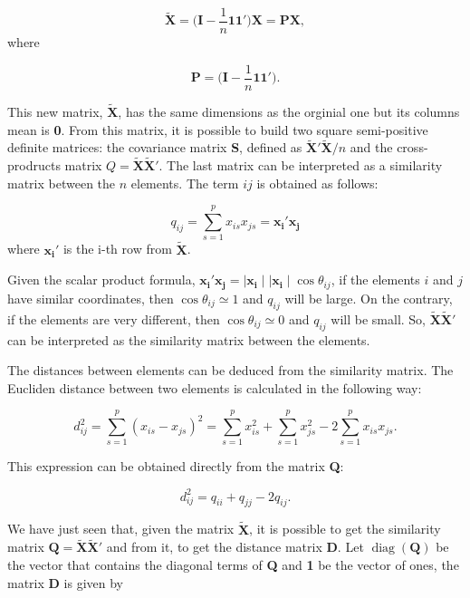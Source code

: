 \documentclass[11pt]{report}
\DeclareMathOperator{\diag}{diag}
\begin{document}
\[
\mathbf{\widetilde{X}} = \Big( \mathbf{I} - \frac{1}{n} \mathbf{1}\mathbf{1'}\Big) \mathbf{X} = \mathbf{P}\mathbf{X},
\]
where 

\[
\mathbf{P} = \Big( \mathbf{I} - \frac{1}{n} \mathbf{1}\mathbf{1'}\Big).
\]

\indent This new matrix, $\mathbf{\widetilde{X}}$, has the same dimensions as 
the orginial one but its columns mean is \textbf{0}. From this matrix, it is 
possible to build two square semi-positive definite matrices: the covariance 
matrix \textbf{S}, defined as $\mathbf{\widetilde{X}'}\mathbf{\widetilde{X}}/n$ 
and the cross-prodructs matrix $Q = \mathbf{\widetilde{X}}\mathbf{\widetilde{X}'}$. 
The last matrix can be interpreted as a similarity matrix between the $n$ elements. 
The term $ij$ is obtained as follows:

\begin{equation} \label{qij}
q_{ij} = \sum_{s=1}^{p} x_{is}x_{js} = \mathbf{x_i'} \mathbf{x_j}
\end{equation}
where $\mathbf{x_i}'$ is the i-th row from $\mathbf{\widetilde{X}}$. 

\indent Given the scalar product formula, 
${\mathbf{x_i'}\mathbf{x_j} =  \mid \mathbf{x_i} \mid \mid \mathbf{x_i} \mid \cos\theta_{ij}}$,
if the elements $i$ and $j$ have similar coordinates, then $\cos\theta_{ij} \simeq 1$
and $q_{ij}$ will be large. On the contrary, if the elements are very different,
then $\cos \theta_{ij} \simeq 0$ and $q_{ij}$ will be small. So, 
$\mathbf{\widetilde{X}}\mathbf{\widetilde{X}'}$ can be interpreted as the similarity
matrix between the elements.

\indent The distances between elements can be deduced from the similarity 
matrix. The Eucliden distance between two elements is calculated in the 
following way:

\begin{equation} \label{dij}
d^2_{ij} =  \sum_{s=1}^{p} (x_{is}- x_{js} )^2  = \sum_{s=1}^{p}x_{is}^2 + \sum_{s=1}^p x_{js}^2 - 2\sum_{s=1}^{p} x_{is}x_{js}.
\end{equation}

\indent This expression can be obtained directly from the matrix \textbf{Q}:

\begin{equation} \label{dfromq}
d^2_{ij} = q_{ii} + q_{jj} - 2q_{ij}.
\end{equation}

\indent We have just seen that, given the matrix $\mathbf{\widetilde{X}}$, 
it is possible to get the similarity matrix 
$\mathbf{Q} = \mathbf{\widetilde{X}}\mathbf{\widetilde{X}'}$ and from it, 
to get the distance matrix \textbf{D}. Let $\diag(\mathbf{Q})$ be the
vector that contains the diagonal terms of \textbf{Q} and \textbf{1} be the vector
of ones, the matrix \textbf{D} is given by
\end{document}
